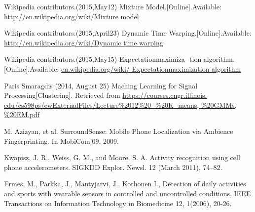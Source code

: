 \documentclass[a4paper, 10pt, conference]{IEEEtran}      %
\begin{document}
\begin{thebibliography}{99}

 Wikipedia contributors.(2015,May12) Mixture Model.[Online].Available:
\url{http://en.wikipedia.org/wiki/Mixture model}

 Wikipedia contributors.(2015,April23) Dynamic Time Warping.[Online].Available: \url{http://en.wikipedia.org/wiki/Dynamic time warping}

 Wikipedia contributors.(2015,May15) Expectationmaximiza- tion algorithm.[Online].Available: \url{en.wikipedia.org/wiki/ Expectationmaximization algorithm}

 Paris Smaragdis (2014, August 25) Maching Learning for Signal Processing[Clustering]. Retrieved from \url{https://courses.engr.illinois. edu/cs598ps/ewExternalFiles/Lecture%2012%20- %20K- means, %20GMMs, %20EM.pdf}

 M. Azizyan, et al. SurroundSense: Mobile Phone Localization
via Ambience Fingerprinting. In MobiCom’09, 2009.

 Kwapisz, J. R., Weiss, G. M., and Moore, S. A. Activity
recognition using cell phone accelerometers. SIGKDD
Explor. Newsl. 12 (March 2011), 74–82.

 Ermes, M., Parkka, J., Mantyjarvi, J., Korhonen I., Detection
of daily activities and sports with wearable sensors in
controlled and uncontrolled conditions, IEEE Transactions on
Information Technology in Biomedicine 12, 1(2006), 20-26. 
\end{thebibliography}
\end{document}
